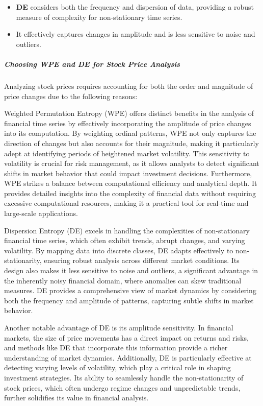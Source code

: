 \begin{itemize} \item \textbf{DE} considers both the frequency and dispersion of data, providing a robust measure of complexity for non-stationary time series. \item It effectively captures changes in amplitude and is less sensitive to noise and outliers. \end{itemize}

\subparagraph{Choosing WPE and DE for Stock Price Analysis}
Analyzing stock prices requires accounting for both the order and magnitude of price changes due to the following reasons:



Weighted Permutation Entropy (WPE) offers distinct benefits in the analysis of financial time series by effectively incorporating the amplitude of price changes into its computation. By weighting ordinal patterns, WPE not only captures the direction of changes but also accounts for their magnitude, making it particularly adept at identifying periods of heightened market volatility. This sensitivity to volatility is crucial for risk management, as it allows analysts to detect significant shifts in market behavior that could impact investment decisions. Furthermore, WPE strikes a balance between computational efficiency and analytical depth. It provides detailed insights into the complexity of financial data without requiring excessive computational resources, making it a practical tool for real-time and large-scale applications.



Dispersion Entropy (DE) excels in handling the complexities of non-stationary financial time series, which often exhibit trends, abrupt changes, and varying volatility. By mapping data into discrete classes, DE adapts effectively to non-stationarity, ensuring robust analysis across different market conditions. Its design also makes it less sensitive to noise and outliers, a significant advantage in the inherently noisy financial domain, where anomalies can skew traditional measures. DE provides a comprehensive view of market dynamics by considering both the frequency and amplitude of patterns, capturing subtle shifts in market behavior.

Another notable advantage of DE is its amplitude sensitivity. In financial markets, the size of price movements has a direct impact on returns and risks, and methods like DE that incorporate this information provide a richer understanding of market dynamics. Additionally, DE is particularly effective at detecting varying levels of volatility, which play a critical role in shaping investment strategies. Its ability to seamlessly handle the non-stationarity of stock prices, which often undergo regime changes and unpredictable trends, further solidifies its value in financial analysis.

